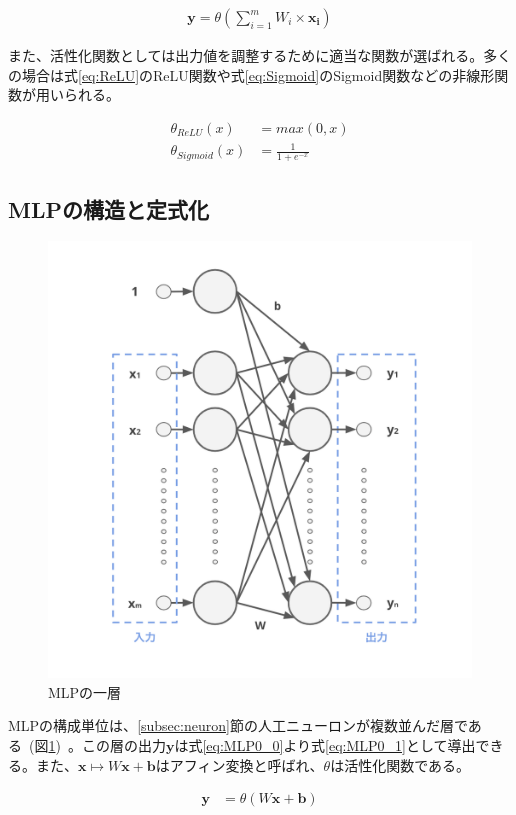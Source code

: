 \begin{align}
    \label{eq:MLP0_0}
    \boldsymbol{y}=\theta(\sum_{i=1}^{m} W_{i} \times \boldsymbol{x_i})
\end{align}

また、活性化関数としては出力値を調整するために適当な関数が選ばれる。多くの場合は式\ref{eq:ReLU}のReLU関数や式\ref{eq:Sigmoid}のSigmoid関数などの非線形関数が用いられる。

\begin{align}
    \label{eq:ReLU}
    \theta_{ReLU}(x)&=max(0,x)\\
    \label{eq:Sigmoid}
    \theta_{Sigmoid}(x)&=\frac{1}{1+e^{-x}}
\end{align}

\subsection{MLPの構造と定式化}

\begin{figure}[b]
\begin{center}
\includegraphics[width=0.6\hsize]{figure/mlp_net0.png}
\caption{MLPの一層}
\label{fig:MLP_net0}
\end{center}
\end{figure}

MLPの構成単位は、\ref{subsec:neuron}節の人工ニューロンが複数並んだ層である~(図\ref{fig:MLP_net0})~。この層の出力$\boldsymbol{y}$は式\ref{eq:MLP0_0}より式\ref{eq:MLP0_1}として導出できる。また、$\boldsymbol{x} \mapsto W\boldsymbol{x}+\boldsymbol{b}$はアフィン変換と呼ばれ、$\theta$は活性化関数である。

\begin{align}
    \label{eq:MLP0_1}
    \boldsymbol{y}&=\theta(W\boldsymbol{x}+\boldsymbol{b})
\end{align}

